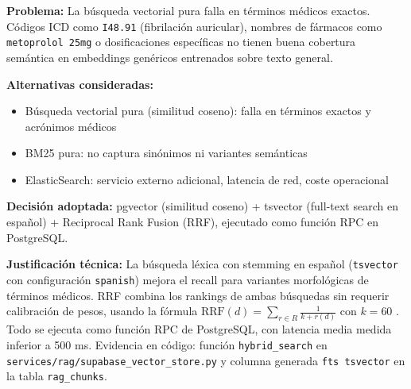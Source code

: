 \begin{tcolorbox}[
  enhanced, breakable,
  colback=purple!4, colframe=purple!45,
  title={\footnotesize\sffamily\bfseries Decisión 3 — Búsqueda híbrida vectorial-léxica con RRF (vs.\ búsqueda vectorial pura)},
  fonttitle=\color{white},
  attach boxed title to top left={yshift=-2mm, xshift=4mm},
  boxed title style={colback=purple!55, rounded corners},
  left=4pt, right=4pt, top=4pt, bottom=4pt
]
\footnotesize
\textbf{Problema:} La búsqueda vectorial pura falla en términos médicos exactos. Códigos ICD como \texttt{I48.91} (fibrilación auricular), nombres de fármacos como \texttt{metoprolol 25mg} o dosificaciones específicas no tienen buena cobertura semántica en embeddings genéricos entrenados sobre texto general.

\textbf{Alternativas consideradas:}
\begin{itemize}[nosep, leftmargin=*]
  \item Búsqueda vectorial pura (similitud coseno): falla en términos exactos y acrónimos médicos
  \item BM25 pura: no captura sinónimos ni variantes semánticas
  \item ElasticSearch: servicio externo adicional, latencia de red, coste operacional
\end{itemize}

\textbf{Decisión adoptada:} pgvector (similitud coseno) + tsvector (full-text search en español) + Reciprocal Rank Fusion (RRF), ejecutado como función RPC en PostgreSQL.

\textbf{Justificación técnica:} La búsqueda léxica con stemming en español (\texttt{tsvector} con configuración \texttt{spanish}) mejora el recall para variantes morfológicas de términos médicos. RRF combina los rankings de ambas búsquedas sin requerir calibración de pesos, usando la fórmula $\text{RRF}(d) = \sum_{r \in R} \frac{1}{k + r(d)}$ con $k=60$ \citep{Cormack2009}. Todo se ejecuta como función RPC de PostgreSQL, con latencia media medida inferior a 500 ms. Evidencia en código: función \texttt{hybrid\_search} en \texttt{services/rag/supabase\_vector\_store.py} y columna generada \texttt{fts tsvector} en la tabla \texttt{rag\_chunks}.
\end{tcolorbox}

